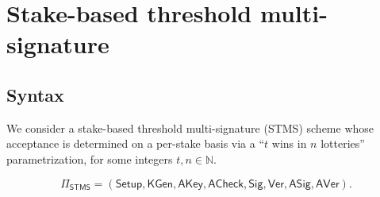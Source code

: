 \documentclass{article}
\begin{document}
\section{Stake-based threshold multi-signature}


\subsection{Syntax}

We consider a stake-based threshold multi-signature (STMS) scheme whose acceptance is determined on a per-stake basis via a ``$t$ wins in $n$ lotteries'' parametrization, for some integers $t,n \in \mathbb{N}$.



\[
  \Pi_{\mathsf{STMS}}
  =
  (\mathsf{Setup}, \mathsf{KGen}, \mathsf{AKey}, \mathsf{ACheck},
   \mathsf{Sig}, \mathsf{Ver}, \mathsf{ASig}, \mathsf{AVer}) .
\]
\end{document}
